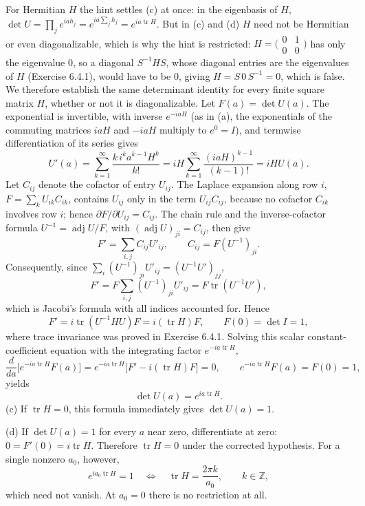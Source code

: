 For Hermitian $H$ the hint settles (c) at once: in the eigenbasis of
$H$, $\det U=\prod_je^{iah_j}=e^{ia\sum_jh_j}=e^{ia\operatorname{tr}H}$.
But in (c) and (d) $H$ need not be Hermitian or even diagonalizable,
which is why the hint is restricted:
$H=\bigl(\begin{smallmatrix}0&1\\0&0\end{smallmatrix}\bigr)$ has only
the eigenvalue $0$, so a diagonal $S^{-1}HS$, whose diagonal entries
are the eigenvalues of $H$ (Exercise 6.4.1), would have to be $0$,
giving $H=S\,0\,S^{-1}=0$, which is false. We therefore establish the
same determinant identity for every finite square matrix $H$, whether
or not it is diagonalizable.
Let $F(a)=\det U(a)$. The exponential is invertible, with inverse
$e^{-iaH}$ (as in (a), the exponentials of the commuting matrices $iaH$
and $-iaH$ multiply to $e^0=I$), and termwise differentiation of its
series gives
\[
U'(a)=\sum_{k=1}^\infty\frac{k\,i^ka^{k-1}H^k}{k!}
=iH\sum_{k=1}^\infty\frac{(iaH)^{k-1}}{(k-1)!}=iHU(a).
\]
Let $C_{ij}$ denote the cofactor of entry $U_{ij}$. The Laplace
expansion along row $i$, $F=\sum_kU_{ik}C_{ik}$, contains $U_{ij}$ only
in the term $U_{ij}C_{ij}$, because no cofactor $C_{ik}$ involves
row $i$; hence $\partial F/\partial U_{ij}=C_{ij}$. The chain rule and
the inverse-cofactor formula $U^{-1}=\operatorname{adj}U/F$, with
$(\operatorname{adj}U)_{ji}=C_{ij}$, then give
\[
 F'=\sum_{i,j}C_{ij}U'_{ij},\qquad
 C_{ij}=F(U^{-1})_{ji}.
\]
Consequently, since $\sum_i(U^{-1})_{ji}U'_{ij}=(U^{-1}U')_{jj}$,
\[
 F'=F\sum_{i,j}(U^{-1})_{ji}U'_{ij}
   =F\operatorname{tr}(U^{-1}U'),
\]
which is Jacobi's formula with all indices accounted for. Hence
\[
F'=i\operatorname{tr}(U^{-1}HU)F=i(\operatorname{tr}H)F,
\qquad F(0)=\det I=1,
\]
where trace invariance was proved in Exercise 6.4.1. Solving this scalar
constant-coefficient equation with the integrating factor
$e^{-ia\operatorname{tr}H}$,
\[
\frac{d}{da}\bigl[e^{-ia\operatorname{tr}H}F(a)\bigr]
=e^{-ia\operatorname{tr}H}\bigl[F'-i(\operatorname{tr}H)F\bigr]=0,
\qquad
e^{-ia\operatorname{tr}H}F(a)=F(0)=1,
\]
yields
\[
\boxed{\det U(a)=e^{ia\operatorname{tr}H}.}
\]
(c) If $\operatorname{tr}H=0$, this formula immediately gives
$\det U(a)=1$.

(d) If $\det U(a)=1$ for every $a$ near zero, differentiate at zero:
$0=F'(0)=i\operatorname{tr}H$. Therefore
$\boxed{\operatorname{tr}H=0}$ under the corrected hypothesis.
For a single nonzero $a_0$, however,
\[
e^{ia_0\operatorname{tr}H}=1
\quad\Longleftrightarrow\quad
\operatorname{tr}H=\frac{2\pi k}{a_0},\qquad k\in\mathbb Z,
\]
which need not vanish. At $a_0=0$ there is no restriction at all.

